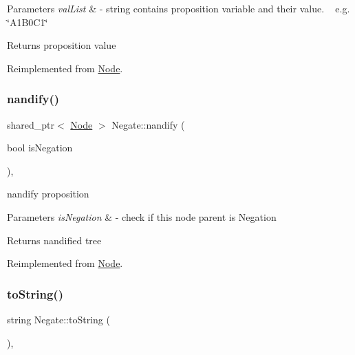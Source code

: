 \begin{DoxyParams}{Parameters}
{\em val\+List} & -\/ string contains proposition variable and their value. ~\newline
 e.\+g. \char`\"{}\+A1\+B0\+C1\char`\"{} \\
\hline
\end{DoxyParams}
\begin{DoxyReturn}{Returns}
proposition value 
\end{DoxyReturn}


Reimplemented from \hyperlink{class_node_afd0c2045f3955e02e3aa1e2e987f10b2}{Node}.

\mbox{\label{class_negate_a2dd4cada504739fea3583a5729044c71}} 
\subsubsection{\texorpdfstring{nandify()}{nandify()}}
{\footnotesize\ttfamily shared\+\_\+ptr$<$ \hyperlink{class_node}{Node} $>$ Negate\+::nandify (\begin{DoxyParamCaption}\item[{bool}]{is\+Negation }\end{DoxyParamCaption})\hspace{0.3cm}{\ttfamily [override]}, {\ttfamily [virtual]}}



nandify proposition 


\begin{DoxyParams}{Parameters}
{\em is\+Negation} & -\/ check if this node parent is Negation \\
\hline
\end{DoxyParams}
\begin{DoxyReturn}{Returns}
nandified tree 
\end{DoxyReturn}


Reimplemented from \hyperlink{class_node_a3b2e192b59b7e72908af7903c5a4e5c1}{Node}.

\mbox{\label{class_negate_aab87b217ffd5c8ba404022a5f4cec220}} 
\subsubsection{\texorpdfstring{to\+String()}{toString()}}
{\footnotesize\ttfamily string Negate\+::to\+String (\begin{DoxyParamCaption}{ }\end{DoxyParamCaption})\hspace{0.3cm}{\ttfamily [override]}, {\ttfamily [virtual]}}



